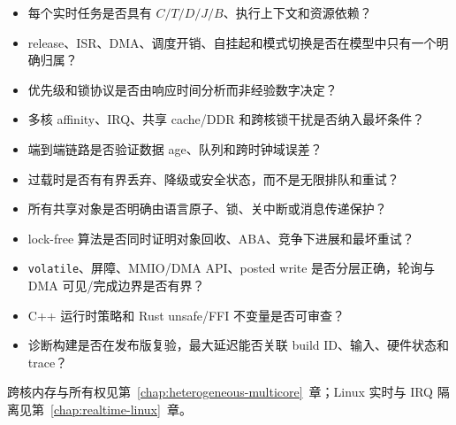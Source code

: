 \begin{itemize}
  \item 每个实时任务是否具有 $C/T/D/J/B$、执行上下文和资源依赖？
  \item release、ISR、DMA、调度开销、自挂起和模式切换是否在模型中只有一个明确归属？
  \item 优先级和锁协议是否由响应时间分析而非经验数字决定？
  \item 多核 affinity、IRQ、共享 cache/DDR 和跨核锁干扰是否纳入最坏条件？
  \item 端到端链路是否验证数据 age、队列和跨时钟域误差？
  \item 过载时是否有有界丢弃、降级或安全状态，而不是无限排队和重试？
  \item 所有共享对象是否明确由语言原子、锁、关中断或消息传递保护？
  \item lock-free 算法是否同时证明对象回收、ABA、竞争下进展和最坏重试？
  \item \texttt{volatile}、屏障、MMIO/DMA API、posted write 是否分层正确，轮询与 DMA 可见/完成边界是否有界？
  \item C++ 运行时策略和 Rust unsafe/FFI 不变量是否可审查？
  \item 诊断构建是否在发布版复验，最大延迟能否关联 build ID、输入、硬件状态和 trace？
\end{itemize}

跨核内存与所有权见第~\ref{chap:heterogeneous-multicore}~章；Linux 实时与 IRQ 隔离见第~\ref{chap:realtime-linux}~章。

